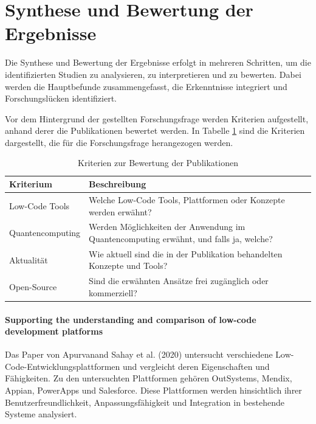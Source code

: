 
\section{Synthese und Bewertung der Ergebnisse}
Die Synthese und Bewertung der Ergebnisse erfolgt in mehreren Schritten, um die identifizierten Studien zu analysieren, 
zu interpretieren und zu bewerten. Dabei werden die Hauptbefunde zusammengefasst, die Erkenntnisse integriert und 
Forschungslücken identifiziert. 

Vor dem Hintergrund der gestellten Forschungsfrage werden Kriterien aufgestellt, anhand derer die Publikationen 
bewertet werden. In Tabelle \ref{tab:evaluation_criteria} sind die Kriterien dargestellt, die für die Forschungsfrage 
herangezogen werden. 

\begin{table}[h!]
    \centering
    \caption{Kriterien zur Bewertung der Publikationen}
    \label{tab:evaluation_criteria}
    \begin{tabular}{|p{5cm}|p{9cm}|}
    \hline
    \textbf{Kriterium} & \textbf{Beschreibung} \\ \hline
    Low-Code Tools & Welche Low-Code Tools, Plattformen oder Konzepte werden erwähnt? \\ \hline
    Quantencomputing & Werden Möglichkeiten der Anwendung im Quantencomputing erwähnt, und falls ja, welche? \\ \hline
    Aktualität & Wie aktuell sind die in der Publikation behandelten Konzepte und Tools? \\ \hline
    Open-Source & Sind die erwähnten Ansätze frei zugänglich oder kommerziell? \\ \hline
    \end{tabular}
\end{table}

\paragraph{Supporting the understanding and comparison of low-code development platforms}

Das Paper von Apurvanand Sahay et al. (2020) \cite{Sahay_2020} untersucht verschiedene Low-Code-Entwicklungsplattformen und vergleicht deren 
Eigenschaften und Fähigkeiten. Zu den untersuchten Plattformen gehören OutSystems, Mendix, Appian, PowerApps und Salesforce. 
Diese Plattformen werden hinsichtlich ihrer Benutzerfreundlichkeit, Anpassungsfähigkeit und Integration in bestehende Systeme analysiert.

